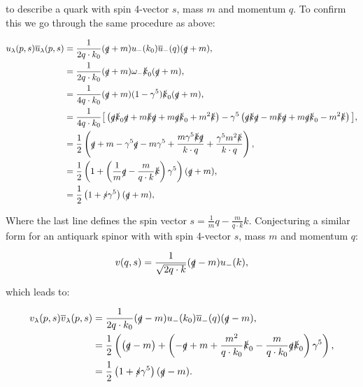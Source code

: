 	to describe a quark with spin 4-vector $s$, mass $m$ and momentum $q$.  To confirm this we go through the same procedure as above:

	\begin{subequations}
	\begin{align*}
		u_\lambda(p,s)\overline{u}_\lambda(p,s) &= \frac{1}{2q\cdot k_0}(\slashed q + m) u_-(k_0)\overline{u}_-(q)(\slashed q + m),\\
		&= \frac{1}{2q\cdot k_0}(\slashed q + m) \omega_-\slashed k_0 (\slashed q + m), \\
		&= \frac{1}{4q\cdot k_0}(\slashed q + m) (1-\gamma^{5})\slashed k_0 (\slashed q + m), \\
		&= \frac{1}{4q\cdot k_0}\big[\left(\slashed q \slashed k_0 \slashed q + m\slashed k\slashed q + m\slashed q \slashed
		k_0 + m^2 \slashed k\right)-\gamma^{5}\left(\slashed q\slashed k\slashed q - m\slashed k\slashed q + m\slashed q\slashed k_0 - m^2\slashed k\right)\big], \\
		&= \frac{1}{2}\left(\slashed q + m - \gamma^{5}\slashed q - m\gamma^{5} + \frac{m\gamma^{5}\slashed k\slashed q}{k\cdot q} + \frac{\gamma^{5}m^2\slashed k}{k\cdot q}\right),\\
		&= \frac{1}{2}\left(1+\left(\frac{1}{m}\slashed q - \frac{m}{q\cdot k}\slashed k\right)\gamma^{5}\right)(\slashed q + m),\\
		&= \frac{1}{2}\left(1+\slashed s\gamma^{5}\right)(\slashed q + m),\\
	\end{align*}
	\end{subequations}

	Where the last line defines the spin vector $s = \frac{1}{m} q - \frac{m}{q\cdot k}k$.  Conjecturing
	a similar form for an antiquark spinor with with spin 4-vector $s$, mass $m$ and momentum $q$:

	\begin{equation}
		\label{v_def}
		v(q, s) = \frac{1}{\sqrt{2q\cdot k}}(\slashed q - m)u_-(k),
	\end{equation}

	which leads to:

	\begin{subequations}
	\begin{align*}
		v_\lambda(p,s)\overline{v}_\lambda(p,s) &= \frac{1}{2q\cdot k_0}(\slashed q - m) u_-(k_0)\overline{u}_-(q)(\slashed q - m),\\
		&= \frac{1}{2}\left(\left(\slashed q - m\right) + \left(-\slashed q + m + \frac{m^2}{q\cdot k_0}\slashed k_0 -
		\frac{m}{q\cdot k_0}\slashed q\slashed k_0 \right)\gamma^{5}\right), \\
		&= \frac{1}{2}\left(1+\slashed s\gamma^{5}\right)(\slashed q - m).\\
	\end{align*}
	\end{subequations}

